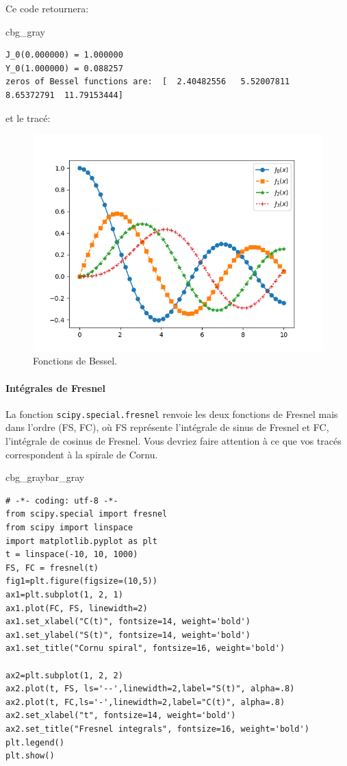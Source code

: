 \documentclass[%
oneside,                 %
final,                   %
10pt,french]{article}
\newenvironment{_cod_tight}[1]{
   \def\FrameCommand{\colorbox{#1}}
   \FrameRule0.6pt\MakeFramed {\FrameRestore}\vskip3mm}
   {\vskip0mm\endMakeFramed}
\newenvironment{cod}[1]{
\bgroup\rmfamily
\fboxsep=0mm\relax
\begin{_cod_tight}{#1}
\list{}{\parsep=-2mm\parskip=0mm\topsep=0pt\leftmargin=2mm
\rightmargin=2\leftmargin\leftmargin=4pt\relax}
\item\relax}
{\endlist\end{_cod_tight}\egroup}
\newenvironment{_pro_tight}[2]{
   \def\FrameCommand{\color{#2}\vrule width 1mm\normalcolor\colorbox{#1}}
   \FrameRule0.6pt\MakeFramed {\advance\hsize-2mm\FrameRestore}\vskip3mm}
   {\vskip0mm\endMakeFramed}
\newenvironment{pro}[2]{
\bgroup\rmfamily
\fboxsep=0mm\relax
\begin{_pro_tight}{#1}{#2}
\list{}{\parsep=-2mm\parskip=0mm\topsep=0pt\leftmargin=2mm
\rightmargin=2\leftmargin\leftmargin=4pt\relax}
\item\relax}
{\endlist\end{_pro_tight}\egroup}
\begin{document}
Ce code retournera:
\begin{cod}{cbg_gray}\begin{verbatim}
J_0(0.000000) = 1.000000
Y_0(1.000000) = 0.088257
zeros of Bessel functions are:  [  2.40482556   5.52007811   8.65372791  11.79153444]
\end{verbatim}
\end{cod}
\noindent

et le tracé:


\begin{figure}[!ht]  %
  \centerline{\includegraphics[width=0.7\linewidth]{imgs/Bessel.png}}
  \caption{
  Fonctions de Bessel. \label{fig:Bessel}
  }
\end{figure}


\paragraph{Intégrales de Fresnel}

La fonction \texttt{scipy.special.fresnel} renvoie les deux fonctions de Fresnel mais dans l'ordre (FS, FC), où FS représente l'intégrale de sinus de Fresnel et FC, l'intégrale de cosinus de Fresnel. Vous devriez faire attention à ce que vos tracés correspondent à la spirale de Cornu.

\begin{pro}{cbg_gray}{bar_gray}\begin{verbatim}
# -*- coding: utf-8 -*-
from scipy.special import fresnel
from scipy import linspace
import matplotlib.pyplot as plt
t = linspace(-10, 10, 1000)
FS, FC = fresnel(t)
fig1=plt.figure(figsize=(10,5))
ax1=plt.subplot(1, 2, 1)
ax1.plot(FC, FS, linewidth=2)
ax1.set_xlabel("C(t)", fontsize=14, weight='bold')
ax1.set_ylabel("S(t)", fontsize=14, weight='bold')
ax1.set_title("Cornu spiral", fontsize=16, weight='bold')

ax2=plt.subplot(1, 2, 2) 
ax2.plot(t, FS, ls='--',linewidth=2,label="S(t)", alpha=.8)
ax2.plot(t, FC,ls='-',linewidth=2,label="C(t)", alpha=.8)
ax2.set_xlabel("t", fontsize=14, weight='bold')
ax2.set_title("Fresnel integrals", fontsize=16, weight='bold')
plt.legend()
plt.show()
\end{verbatim}
\end{pro}
\noindent
\end{document}
